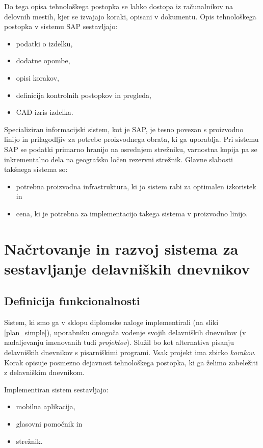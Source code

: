 \documentclass[a4paper, 12pt]{book}
\begin{document}
Do tega opisa tehnološkega postopka se lahko dostopa iz računalnikov na delovnih mestih, kjer se izvajajo koraki, opisani v dokumentu.
Opis tehnološkega postopka v sistemu SAP sestavljajo:
\begin{itemize}
	\item podatki o izdelku,
	\item dodatne opombe,
	\item opisi korakov,
	\item definicija kontrolnih postopkov in pregleda, 
	\item CAD izris izdelka.
\end{itemize}

Specializiran informacijski sistem, kot je SAP, je tesno povezan s proizvodno linijo in prilagodljiv za potrebe proizvodnega obrata, ki ga uporablja.
Pri sistemu SAP se podatki primarno hranijo na osrednjem strežniku, varnostna kopija pa se inkrementalno dela na geografsko ločen rezervni strežnik.
Glavne slabosti takšnega sistema so:
\begin{itemize}
	\item potrebna proizvodna infrastruktura, ki jo sistem rabi za optimalen izkoristek in
	\item cena, ki je potrebna za implementacijo takega sistema v proizvodno linijo.
\end{itemize}


\chapter{Načrtovanje in razvoj sistema za sestavljanje delavniških dnevnikov}

\section{Definicija funkcionalnosti}

Sistem, ki smo ga v sklopu diplomske naloge implementirali (na sliki \ref{plan_simple}), uporabniku omogoča vodenje svojih delavniških dnevnikov (v nadaljevanju imenovanih tudi \textit{projektov}).
Služil bo kot alternativa pisanju delavniških dnevnikov s pisarniškimi programi.
Vsak projekt ima zbirko \textit{korakov}.
Korak opisuje posmezno dejavnost tehnološkega postopka, ki ga želimo zabeležiti z delavniškim dnevnikom.

Implementiran sistem sestavljajo:
\begin{itemize}
	\item mobilna aplikacija,
	\item glasovni pomočnik in
	\item strežnik.
\end{itemize}
\end{document}
